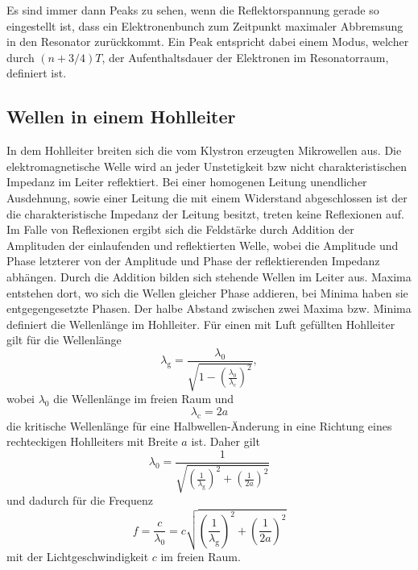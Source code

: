 Es sind immer dann Peaks zu sehen, wenn die Reflektorspannung gerade so eingestellt ist, dass ein Elektronenbunch zum Zeitpunkt maximaler Abbremsung in den Resonator zurückkommt.
Ein Peak entspricht dabei einem Modus, welcher durch $(n+3/4)T$, der Aufenthaltsdauer der Elektronen im Resonatorraum, definiert ist.

\subsection{Wellen in einem Hohlleiter}

In dem Hohlleiter breiten sich die vom Klystron erzeugten Mikrowellen aus.
Die elektromagnetische Welle wird an jeder Unstetigkeit bzw nicht charakteristischen Impedanz im Leiter reflektiert.
Bei einer homogenen Leitung unendlicher Ausdehnung, sowie einer Leitung die mit einem Widerstand abgeschlossen ist der die charakteristische Impedanz der Leitung besitzt, treten keine Reflexionen auf.
Im Falle von Reflexionen ergibt sich die Feldstärke durch Addition der Amplituden der einlaufenden und reflektierten Welle, wobei die Amplitude und Phase letzterer von der Amplitude und Phase der reflektierenden Impedanz abhängen.
Durch die Addition bilden sich stehende Wellen im Leiter aus.
Maxima entstehen dort, wo sich die Wellen gleicher Phase addieren, bei Minima haben sie entgegengesetzte Phasen.
Der halbe Abstand zwischen zwei Maxima bzw. Minima definiert die Wellenlänge im Hohlleiter.
Für einen mit Luft gefüllten Hohlleiter gilt für die Wellenlänge
\begin{equation}
  \lambda_\text{g} = \frac{\lambda_0}{\sqrt{1-\left(\frac{\lambda_0}{\lambda_\text{c}}\right)^2}},
\end{equation}
wobei $\lambda_0$ die Wellenlänge im freien Raum und
\begin{equation}
  \lambda_\text{c} = 2a%
\end{equation}
die kritische Wellenlänge für eine Halbwellen-Änderung in eine Richtung eines rechteckigen Hohlleiters mit Breite $a$ ist.
Daher gilt
\begin{equation}
  \lambda_0 = \frac{1}{\sqrt{\left(\frac{1}{\lambda_\text{g}}\right)^2+\left(\frac{1}{2a}\right)^2}} \label{eqn:1}
\end{equation}
und dadurch für die Frequenz
\begin{equation}
  f = \frac{c}{\lambda_0} = c \sqrt{\left(\frac{1}{\lambda_\text{g}}\right)^2+\left(\frac{1}{2a}\right)^2} \label{eqn:2}
\end{equation}
mit der Lichtgeschwindigkeit $c$ im freien Raum.

